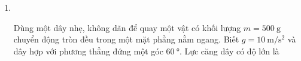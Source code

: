 \begin{enumerate}[label=\bfseries Câu \arabic*:,leftmargin=1.5cm]
\item {}\\
{Dùng một dây nhẹ, không dãn để quay một vật có khối lượng $m=\SI{500}{\gram}$ chuyển động tròn đều trong một mặt phẳng nằm ngang. Biết $g =\SI{10}{\meter/\second^2}$ và dây hợp với phương thẳng đứng một góc $\SI{60}{\degree}$. Lực căng dây có độ lớn là
}
\end{enumerate}